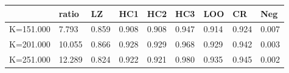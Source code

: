 \begin{table}[ht]
\centering
\begin{tabular}{rllllllll}
  \hline
 & ratio & LZ & HC1 & HC2 & HC3 & LOO & CR & Neg \\ 
  \hline
K=151.000 &  7.793 & 0.859 & 0.908 & 0.908 & 0.947 & 0.914 & 0.924 & 0.007 \\ 
  K=201.000 & 10.055 & 0.866 & 0.928 & 0.929 & 0.968 & 0.929 & 0.942 & 0.003 \\ 
  K=251.000 & 12.289 & 0.824 & 0.922 & 0.921 & 0.980 & 0.935 & 0.945 & 0.002 \\ 
   \hline
\end{tabular}
\end{table}
